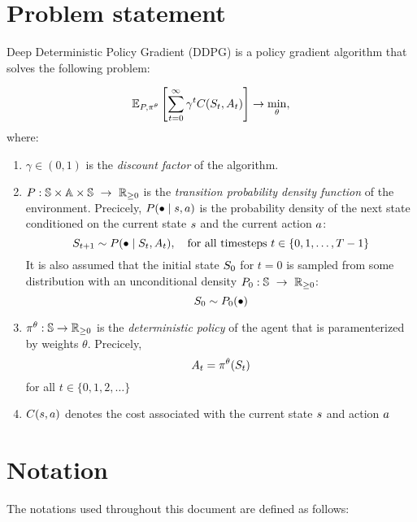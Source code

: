\documentclass[12pt,twoside]{../../mitthesis}
\begin{document}
\section*{Problem statement}
Deep Deterministic Policy Gradient (DDPG) is a policy gradient algorithm that solves the following problem:

\begin{equation}
    \label{eqn_ddpg_problem}
    \E[\transit, \policy^{\theta}]{\sum_{t = 0}^{\infty} \gamma ^ t \Cost(\State_{t}, \Action_{t})} \ra \min_{\theta},
\end{equation}
where:
\begin{enumerate}
    \item $\gamma \in (0, 1)$ is the \textit{discount factor} of the algorithm. 
    \item  $P : \mathbb S \times \mathbb A \times \mathbb S \ \rightarrow \ {\mathbb{R}}_{\geq 0}$ is the \textit{transition probability density function} of the environment. Precicely,  $P(\bullet \mid s, a)$ is the probability density of the next state conditioned on the current state $s$ and the current action $a$:
    $$
        S_{t+1} \sim P(\bullet \mid S_t, A_t), \quad \text{for all timesteps } t \in \{0, 1, \dots, T-1\} 
    $$
    It is also assumed that the initial state $S_0$ for $t = 0$ is sampled from some distribution with an unconditional density $P_0 : \mathbb S \ \rightarrow \ {\mathbb{R}}_{\geq 0}$:
    $$
        S_0 \sim P_0(\bullet)
    $$
    \item $\pi^{\theta} :  \mathbb S \rightarrow {\mathbb{R}}_{\geq 0}$ is the \textit{deterministic policy} of the agent that is paramenterized by weights $\theta$. Precicely,
    $$
        A_t  = \pi^{\theta}(S_t)
    $$
    for all $t \in \{0, 1, 2, \dots\}$
    \item $C(s, a)$ denotes the cost associated with the current state $s$ and action $a$
\end{enumerate}

\section*{Notation}
The notations used throughout this document are defined as follows:
\end{document}
